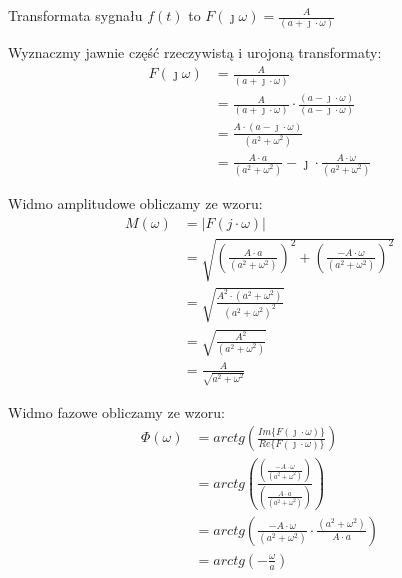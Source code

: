 \begin{task}
Transformata sygnału $f(t)$ to $F(\jmath \omega)=\frac{A}{( a + \jmath \cdot \omega)}$

Wyznaczmy jawnie część rzeczywistą i urojoną transformaty:
\begin{equation}
\begin{aligned}
F(\jmath \omega )&=\frac{A}{( a + \jmath \cdot \omega)}\\
&=\frac{A}{( a + \jmath \cdot \omega)} \cdot \frac{(a - \jmath \cdot \omega)}{(a - \jmath \cdot \omega)}\\
&=\frac{A \cdot ( a - \jmath \cdot \omega)}{( a^2 + \omega^2)}\\
&=\frac{A \cdot a}{( a^2 + \omega^2)} - \jmath \cdot \frac{A \cdot \omega}{( a^2 + \omega^2)}
\end{aligned}
\end{equation}


Widmo amplitudowe obliczamy ze wzoru:
\begin{equation}
\begin{aligned}
M(\omega)&=\left| F(j \cdot \omega) \right|\\
&=\sqrt{\left(\frac{A \cdot a}{( a^2 + \omega^2)}\right)^2 + \left(\frac{-A \cdot \omega}{( a^2 + \omega^2)}\right)^2}\\
&=\sqrt{\frac{A^2 \cdot (a^2+\omega^2)}{(a^2 + \omega^2)^2}}\\
&=\sqrt{\frac{A^2}{(a^2 + \omega^2)}}\\
&=\frac{A}{\sqrt{a^2 + \omega^2}}
\end{aligned}
\end{equation}


Widmo fazowe obliczamy ze wzoru:
\begin{equation}
\begin{aligned}
\Phi ( \omega )&=arctg(\frac{Im\{F(\jmath \cdot \omega )\}}{Re\{F(\jmath \cdot \omega )\}})\\
&=arctg\left(\frac{\left(\frac{-A \cdot \omega}{( a^2 + \omega^2)}\right)}{\left(\frac{A \cdot a}{( a^2 + \omega^2)}\right)}\right)\\
&=arctg\left(\frac{-A \cdot \omega}{( a^2 + \omega^2)} \cdot \frac{( a^2 + \omega^2)}{A \cdot a}\right)\\
&=arctg\left(-\frac{\omega}{a}\right)\\
\end{aligned}
\end{equation}

\end{task}
